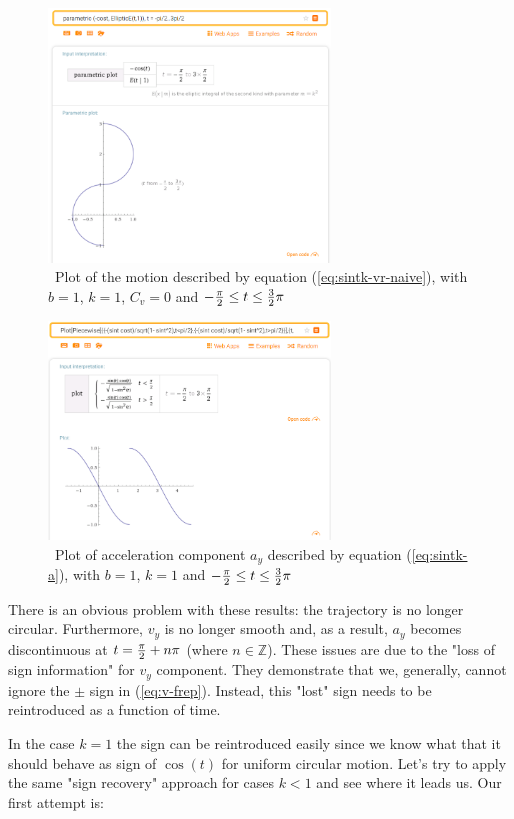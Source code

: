 \documentclass[journal]{IEEEtran}
\begin{document}
\begin{figure}[H]
\includegraphics[width=7.5cm]{sintk-traj-uniform-naive}
\caption{\ Plot of the motion described by equation (\ref{eq:sintk-vr-naive}), with $b=1$, $k=1$, $C_v=0$ and $ - { \pi \over 2 }  \leq t \leq { 3 \over 2 } \pi $ \bigskip}
\centering
\label{fig:sintk-traj-uniform-naive}
\end{figure}

\begin{figure}[H]
\includegraphics[width=7.5cm]{sintk-accel-uniform-naive}
\caption{\ Plot of acceleration component $a_y$ described by equation (\ref{eq:sintk-a}), with $b=1$, $k=1$ and $ - { \pi \over 2 }  \leq t \leq { 3 \over 2 } \pi $ \bigskip}
\centering
\label{fig:sintk-accel-uniform-naive}
\end{figure}


There is an obvious problem with these results: the trajectory is no longer circular. Furthermore, $v_y$ is no longer smooth and, as a result, $a_y$ becomes discontinuous at $t={\pi \over 2} + n\pi$  (where $n \in \mathbb {Z}$). These issues are due to the "loss of sign information" for $v_y$ component. They demonstrate that we, generally, cannot ignore the $\pm$ sign in (\ref{eq:v-frep}). Instead, this "lost" sign needs to be reintroduced as a function of time. 

In the case $k=1$ the sign can be reintroduced easily since we know what that it should behave as sign of $\cos(t)$ for uniform circular motion. Let's try to apply the same "sign recovery" approach for cases $k < 1$ and see where it leads us.  Our first attempt is:
\end{document}
